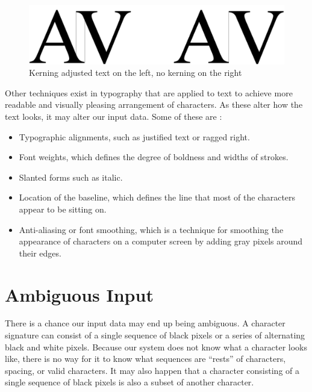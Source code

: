 \begin{figure}[ht]
    \centering
    \includegraphics[width=1.0\textwidth]{fig/chapter2/kerning.png}
    \caption{Kerning adjusted text on the left, no kerning on the right}
    \label{fig:kerning-comparison}
\end{figure}

Other techniques exist in typography that are applied to text to achieve more readable and visually pleasing arrangement of characters. As these alter how the text looks, it may alter our input data. Some of these are \citep[pp.~320,~299,~302,~298,~297]{felici2011complete}:

\begin{itemize}
    \item Typographic alignments, such as justified text or ragged right.
    \item Font weights, which defines the degree of boldness and widths of strokes.
    \item Slanted forms such as italic.
    \item Location of the baseline, which defines the line that most of the characters appear to be sitting on.
    \item Anti-aliasing or font smoothing, which is a technique for smoothing the appearance of characters on a computer screen by adding gray pixels around their edges.
\end{itemize}


\section{Ambiguous Input}
\label{sec:ambiguous_input}
There is a chance our input data may end up being ambiguous. A character signature can consist of a single sequence of black pixels or a series of alternating black and white pixels. Because our system does not know what a character looks like, there is no way for it to know what sequences are ``rests'' of characters, spacing, or valid characters. It may also happen that a character consisting of a single sequence of black pixels is also a subset of another character. 

